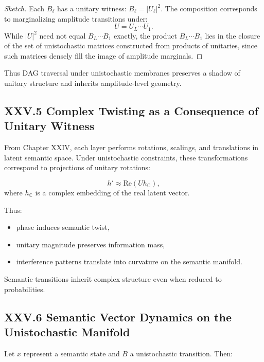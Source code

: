 \documentclass[12pt,letterpaper]{article}
\begin{document}
\begin{proof}[Sketch]
Each $B_\ell$ has a unitary witness: $B_\ell = |U_\ell|^2$.  
The composition corresponds to marginalizing amplitude transitions under:
\[
U = U_L \cdots U_1.
\]
While $|U|^2$ need not equal $B_L \cdots B_1$ exactly, the product $B_L \cdots B_1$ lies in the closure of the set of unistochastic matrices constructed from products of unitaries, since such matrices densely fill the image of amplitude marginals.  
\end{proof}

Thus DAG traversal under unistochastic membranes preserves a shadow of unitary structure and inherits amplitude-level geometry.

\subsection{XXV.5 Complex Twisting as a Consequence of Unitary Witness}

From Chapter XXIV, each layer performs rotations, scalings, and translations in latent semantic space. Under unistochastic constraints, these transformations correspond to projections of unitary rotations:

\[
h' \approx \mathrm{Re}(U h_{\mathbb{C}}),
\]
where $h_{\mathbb{C}}$ is a complex embedding of the real latent vector.

Thus:

\begin{itemize}
    \item phase induces semantic twist,
    \item unitary magnitude preserves information mass,
    \item interference patterns translate into curvature on the semantic manifold.
\end{itemize}

Semantic transitions inherit complex structure even when reduced to probabilities.

\subsection{XXV.6 Semantic Vector Dynamics on the Unistochastic Manifold}

Let $x$ represent a semantic state and $B$ a unistochastic transition. Then:
\end{document}
